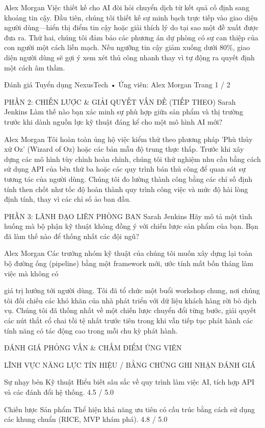 Alex Morgan
Việc thiết kế cho AI đòi hỏi chuyển dịch từ kết quả cố định sang khoảng tin cậy. Đầu tiên, chúng tôi thiết kế sự minh bạch trực tiếp vào giao diện người dùng—hiển thị điểm tin cậy hoặc giải thích lý do tại sao một đề xuất được đưa ra. Thứ hai, chúng tôi đảm bảo các phương án dự phòng có sự can thiệp của con người một cách liền mạch. Nếu ngưỡng tin cậy giảm xuống dưới 80\%, giao diện người dùng sẽ gợi ý xem xét thủ công nhanh thay vì tự động ra quyết định một cách âm thầm.

Đánh giá Tuyển dụng NexusTech • Ứng viên: Alex Morgan
Trang 1 / 2

PHẦN 2: CHIẾN LƯỢC \& GIẢI QUYẾT VẤN ĐỀ (TIẾP THEO)
Sarah Jenkins
Làm thế nào bạn xác minh sự phù hợp giữa sản phẩm và thị trường trước khi dành nguồn lực kỹ thuật đáng kể cho một mô hình AI mới?

Alex Morgan
Tôi hoàn toàn ủng hộ việc kiểm thử theo phương pháp 'Phù thủy xứ Oz' (Wizard of Oz) hoặc các bản mẫu độ trung thực thấp. Trước khi xây dựng các mô hình tùy chỉnh hoàn chỉnh, chúng tôi thử nghiệm nhu cầu bằng cách sử dụng API của bên thứ ba hoặc các quy trình bán thủ công để quan sát sự tương tác của người dùng. Chúng tôi đo lường thành công bằng các chỉ số định tính then chốt như tốc độ hoàn thành quy trình công việc và mức độ hài lòng định tính, thay vì các chỉ số ảo ban đầu.

PHẦN 3: LÃNH ĐẠO LIÊN PHÒNG BAN
Sarah Jenkins
Hãy mô tả một tình huống mà bộ phận kỹ thuật không đồng ý với chiến lược sản phẩm của bạn. Bạn đã làm thế nào để thống nhất các đội ngũ?

Alex Morgan
Các trưởng nhóm kỹ thuật của chúng tôi muốn xây dựng lại toàn bộ đường ống (pipeline) bằng một framework mới, ước tính mất bốn tháng làm việc mà không có

giá trị hướng tới người dùng. Tôi đã tổ chức một buổi workshop chung, nơi chúng tôi đối chiếu các khó khăn của nhà phát triển với dữ liệu khách hàng rời bỏ dịch vụ. Chúng tôi đã thống nhất về một chiến lược chuyển đổi từng bước, giải quyết các nút thắt cổ chai tồi tệ nhất trước tiên trong khi vẫn tiếp tục phát hành các tính năng có tác động cao trong mỗi chu kỳ phát hành.

ĐÁNH GIÁ PHỎNG VẤN \& CHẤM ĐIỂM ỨNG VIÊN

LĨNH VỰC NĂNG LỰC
TÍN HIỆU / BẰNG CHỨNG GHI NHẬN
ĐÁNH GIÁ

Sự nhạy bén Kỹ thuật
Hiểu biết sâu sắc về quy trình làm việc AI, tích hợp API và các đánh đổi hệ thống.
4.5 / 5.0

Chiến lược Sản phẩm
Thể hiện khả năng ưu tiên có cấu trúc bằng cách sử dụng các khung chuẩn (RICE, MVP khám phá).
4.8 / 5.0

